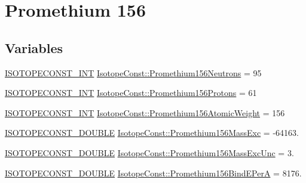 \hypertarget{group___isotope_const-_promethium-_pm156}{}\section{Promethium 156}
\label{group___isotope_const-_promethium-_pm156}
\subsection*{Variables}
\begin{DoxyCompactItemize}
\item 
\mbox{\hyperlink{group___isotope_const-_macros_ga5f18360b3e99483a35c32d789e62621c}{I\+S\+O\+T\+O\+P\+E\+C\+O\+N\+S\+T\+\_\+\+I\+NT}} \mbox{\hyperlink{group___isotope_const-_promethium-_pm156_ga1532e9cfeff2948e63f30f372d00c55f}{Isotope\+Const\+::\+Promethium156\+Neutrons}} = 95
\item 
\mbox{\hyperlink{group___isotope_const-_macros_ga5f18360b3e99483a35c32d789e62621c}{I\+S\+O\+T\+O\+P\+E\+C\+O\+N\+S\+T\+\_\+\+I\+NT}} \mbox{\hyperlink{group___isotope_const-_promethium-_pm156_ga792013a35dd186316efbf08928e38bc4}{Isotope\+Const\+::\+Promethium156\+Protons}} = 61
\item 
\mbox{\hyperlink{group___isotope_const-_macros_ga5f18360b3e99483a35c32d789e62621c}{I\+S\+O\+T\+O\+P\+E\+C\+O\+N\+S\+T\+\_\+\+I\+NT}} \mbox{\hyperlink{group___isotope_const-_promethium-_pm156_ga9fdeddc5bca7564ae4f8948dbfd4941b}{Isotope\+Const\+::\+Promethium156\+Atomic\+Weight}} = 156
\item 
\mbox{\hyperlink{group___isotope_const-_macros_ga8f45a7272ce02c0b4c65c44636ed719a}{I\+S\+O\+T\+O\+P\+E\+C\+O\+N\+S\+T\+\_\+\+D\+O\+U\+B\+LE}} \mbox{\hyperlink{group___isotope_const-_promethium-_pm156_gab9ea0057b4b548d8423b6b03e88a2a4f}{Isotope\+Const\+::\+Promethium156\+Mass\+Exc}} = -\/64163.
\item 
\mbox{\hyperlink{group___isotope_const-_macros_ga8f45a7272ce02c0b4c65c44636ed719a}{I\+S\+O\+T\+O\+P\+E\+C\+O\+N\+S\+T\+\_\+\+D\+O\+U\+B\+LE}} \mbox{\hyperlink{group___isotope_const-_promethium-_pm156_ga21f8525532e920517e24984b79260344}{Isotope\+Const\+::\+Promethium156\+Mass\+Exc\+Unc}} = 3.
\item 
\mbox{\hyperlink{group___isotope_const-_macros_ga8f45a7272ce02c0b4c65c44636ed719a}{I\+S\+O\+T\+O\+P\+E\+C\+O\+N\+S\+T\+\_\+\+D\+O\+U\+B\+LE}} \mbox{\hyperlink{group___isotope_const-_promethium-_pm156_ga41e0232621e4ccaa34279e6ffd02783c}{Isotope\+Const\+::\+Promethium156\+Bind\+E\+PerA}} = 8176.

\end{DoxyCompactItemize}
